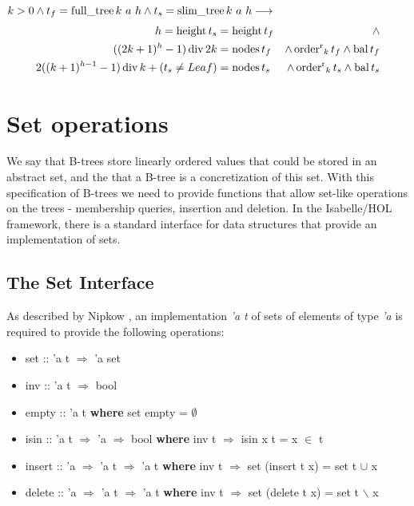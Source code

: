 \begin{theorem}
    $k > 0 \wedge t_f = \operatorname{full\_tree} k\ a\ h \wedge t_s = \operatorname{slim\_tree} k\ a\ h \longrightarrow$
    \begin{align*}
    h = \operatorname{height} t_s &= \operatorname{height} t_f &\wedge \\
        ((2k+1)^h - 1) \operatorname{div} 2k &= \operatorname{nodes} t_f &\wedge \operatorname{order^r}_k t_f \wedge \operatorname{bal} t_f \\ 
        2((k+1)^{h-1} - 1) \operatorname{div} k + (t_s \neq Leaf) &= \operatorname{nodes} t_s &\wedge \operatorname{order^r}_k t_s \wedge \operatorname{bal} t_s
    \end{align*}
\end{theorem}


\section{Set operations}

We say that B-trees store linearly ordered values
that could be stored in an abstract set,
and the that a B-tree is a concretization
of this set.
With this specification of B-trees we need to provide functions that allow
set-like operations on the trees -
membership queries, insertion and deletion.
In the Isabelle/HOL framework, there is a standard interface
for data structures that provide an implementation of sets.

\subsection{The Set Interface}

As described by Nipkow \parencite{DBLP:conf/itp/Nipkow16},
an implementation \textit{'a t} of sets of elements of type \textit{'a} is required to provide the following
operations:

\begin{itemize}
    \itshape
    \item set :: 'a t $\Rightarrow$ 'a set
    \item inv :: 'a t $\Rightarrow$ bool
    \item empty :: 'a t \textup{\textbf{where}} set empty = $\emptyset$
    \item isin :: 'a t $\Rightarrow$ 'a $\Rightarrow$ bool \textup{\textbf{where}} inv t $\Longrightarrow$ isin x t = x $\in$ t
    \item insert :: 'a $\Rightarrow$ 'a t $\Rightarrow$ 'a t \textup{\textbf{where}} inv t $\Longrightarrow$ set (insert t x) = set t $\cup$ {x}
    \item delete :: 'a $\Rightarrow$ 'a t $\Rightarrow$ 'a t \textup{\textbf{where}} inv t $\Longrightarrow$ set (delete t x) = set t $\backslash$ {x}
\end{itemize}

